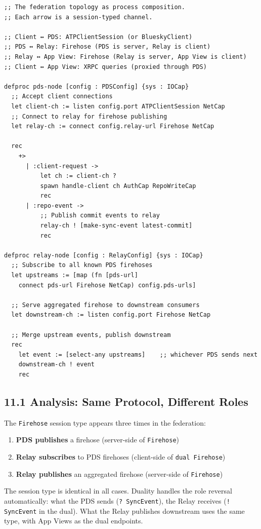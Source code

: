 \documentclass[11pt]{article}
\begin{document}
\begin{verbatim}
;; The federation topology as process composition.
;; Each arrow is a session-typed channel.

;; Client ↔ PDS: ATPClientSession (or BlueskyClient)
;; PDS ↔ Relay: Firehose (PDS is server, Relay is client)
;; Relay ↔ App View: Firehose (Relay is server, App View is client)
;; Client ↔ App View: XRPC queries (proxied through PDS)

defproc pds-node [config : PDSConfig] {sys : IOCap}
  ;; Accept client connections
  let client-ch := listen config.port ATPClientSession NetCap
  ;; Connect to relay for firehose publishing
  let relay-ch := connect config.relay-url Firehose NetCap

  rec
    +>
      | :client-request ->
          let ch := client-ch ?
          spawn handle-client ch AuthCap RepoWriteCap
          rec
      | :repo-event ->
          ;; Publish commit events to relay
          relay-ch ! [make-sync-event latest-commit]
          rec

defproc relay-node [config : RelayConfig] {sys : IOCap}
  ;; Subscribe to all known PDS firehoses
  let upstreams := [map (fn [pds-url]
    connect pds-url Firehose NetCap) config.pds-urls]

  ;; Serve aggregated firehose to downstream consumers
  let downstream-ch := listen config.port Firehose NetCap

  ;; Merge upstream events, publish downstream
  rec
    let event := [select-any upstreams]    ;; whichever PDS sends next
    downstream-ch ! event
    rec
\end{verbatim}
\subsection{11.1 Analysis: Same Protocol, Different Roles}
\label{sec:orgc293917}

The \texttt{Firehose} session type appears three times in the federation:

\begin{enumerate}
\item \textbf{PDS publishes} a firehose (server-side of \texttt{Firehose})
\item \textbf{Relay subscribes} to PDS firehoses (client-side of \texttt{dual Firehose})
\item \textbf{Relay publishes} an aggregated firehose (server-side of \texttt{Firehose})
\end{enumerate}

The session type is identical in all cases. Duality handles the role
reversal automatically: what the PDS sends (\texttt{? SyncEvent}), the Relay
receives (\texttt{! SyncEvent} in the dual). What the Relay publishes downstream
uses the same type, with App Views as the dual endpoints.
\end{document}
